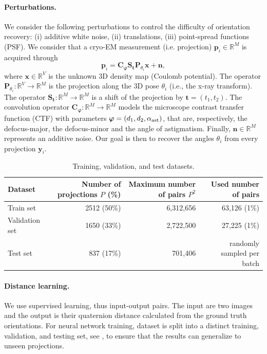 \paragraph{Perturbations.}
We consider the following perturbations to control the difficulty of orientation recovery: (i) additive white noise, (ii) translations, (iii) point-spread functions (PSF).
We consider that a cryo-EM measurement (i.e. projection) $\mathbf{p}_i \in \mathbb{R}^{M}$ is acquired through
\begin{equation}
\label{eq:linear-forward-model}
\mathbf{p}_i={\mathbf {C}_{\boldsymbol\varphi}}\mathbf S_{\mathbf{t}}\mathbf P_{\theta_i}\mathbf x+\mathbf n,
\end{equation}
where $\mathbf x \in \mathbb{R}^{V}$ is the unknown 3D density map\cite{dimaio_creating_2007} (Coulomb potential). The operator $\mathbf P_{\theta_i}: \mathbb R^V \to \mathbb R^M$ is the projection along the 3D pose $\theta_i$ (i.e., the x-ray transform). The operator $\mathbf S_\mathbf{t}: \mathbb R^M \to \mathbb R^M$ is a shift of the projection by $\mathbf{t}=(t_1, t_2)$. The convolution operator $\mathbf {C}_{\boldsymbol\varphi}: \mathbb R^M \to \mathbb R^M$ models the microscope contrast transfer function (CTF) with parameters $\boldsymbol\varphi=(d_1, d_2, \alpha_{\rm ast})$, that are, respectively, the defocus-major, the defocus-minor and the angle of astigmatism. Finally, $\mathbf n \in \mathbb{R}^{M}$ represents an additive noise. Our goal is then to recover the angles $\theta_i$ from every projection $\mathbf y_i$.

\begin{table}[ht!]
    \centering
    \begin{tabular}{lrrr}
        \toprule
        Dataset & Number of projections $P$ (\%) & Maximum number of pairs $P^2$ & Used number of pairs \\
        \midrule
        Train set & 2512 (50\%) & 6,312,656 & 63,126 (1\%) \\
        Validation set & 1650 (33\%) & 2,722,500 & 27,225 (1\%) \\
        Test set & 837 (17\%) & 701,406 & randomly sampled per batch \\
        \bottomrule
    \end{tabular}
    \caption{Training, validation, and test datasets.}\label{tab:dataset}
\end{table}

\paragraph{Distance learning.}
We use supervised learning, thus input-output pairs.
The input are two images and the output is their quaternion distance calculated from the ground truth orientations.
For neural network training, dataset is split into a distinct training, validation, and testing set, see , to ensure that the results can generalize to unseen projections.


